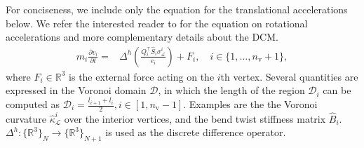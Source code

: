 For conciseness, we include only the equation for the translational accelerations below. We refer the interested reader to \citep{gazzola2018forward} for the equation on rotational accelerations and more complementary details about the \gls{DCM}.
\begin{align}
    m_i \frac{\partial v_i}{\partial t} =& \Delta^h \left ( \frac{Q_i^\top \hat{S}_i \sigma^i_{\mathcal{L}}}{e_i} \right ) + F_i, \quad i\in \{1,\dots,n_\mathrm{v}+1\},
\end{align}
where $F_i \in \mathbb{R}^3$ is the external force acting on the $i$th vertex.
Several quantities are expressed in the Voronoi domain $\mathcal{D}$, in which the length of the region $\mathcal{D}_i$ can be computed as $\mathcal{D}_i = \frac{l_{i+1} + l_i}{2}, i \in [1,n_\mathrm{v}-1]$. Examples are the %
the Voronoi curvature $\hat{\kappa}_{\mathcal{L}}^i$ over the interior vertices, and the bend twist stiffness matrix $\hat{B}_i$.
$\Delta^h : \{\mathbb{R}^3 \}_N \rightarrow \{ \mathbb{R}^3 \}_{N+1}$ is used as the discrete difference operator.


